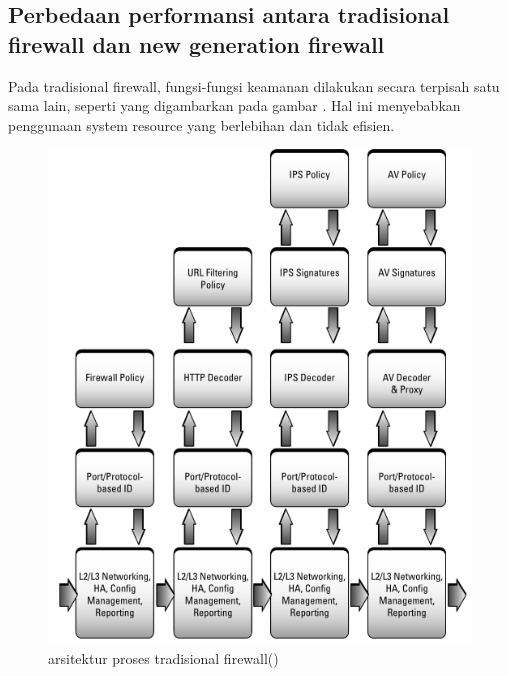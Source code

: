 \subsection{Perbedaan performansi antara tradisional firewall dan new generation firewall}
Pada tradisional firewall, fungsi-fungsi keamanan dilakukan secara terpisah satu sama lain, seperti yang digambarkan pada gambar . Hal ini menyebabkan penggunaan system resource yang berlebihan dan tidak efisien.
\begin{figure}[H]
	\centering
	\includegraphics[width=\textwidth]{resources/architecture_tradisional_firewall.png}
	\caption{arsitektur proses tradisional firewall(\cite{miller2011next})}
	\label{fig:architecture_tradisional_firewall}
\end{figure}

